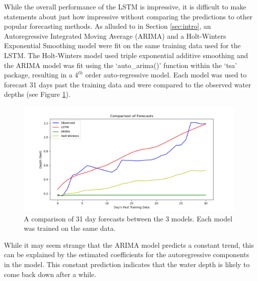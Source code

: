 While the overall performance of the LSTM is impressive, it is difficult to make statements about just how impressive without comparing the predictions to other popular forecasting methods. As alluded to in Section \ref{sec:intro}, an Autoregressive Integrated Moving Average (ARIMA) and a Holt-Winters Exponential Smoothing model were fit on the same training data used for the LSTM. The Holt-Winters model used triple exponential additive smoothing and the ARIMA model was fit using the `auto\_arima()' function within the `tsa' package, resulting in a $4^{th}$ order auto-regressive model. Each model was used to forecast 31 days past the training data and were compared to the observed water depths (see Figure \ref{fig:Comparison}).

\begin{figure}[ht]
    \centering
    \includegraphics[width=1\linewidth]{"Figures/LSTM_ARIMA_HW.png"}
    \caption{A comparison of 31 day forecasts between the 3 models. Each model was trained on the same data.}
    \label{fig:Comparison}
\end{figure}

While it may seem strange that the ARIMA model predicts a constant trend, this can be explained by the estimated coefficients for the autoregressive components in the model. This constant prediction indicates that the water depth is likely to come back down after a while.